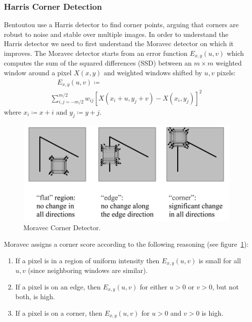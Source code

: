 \subsubsection{Harris Corner Detection}
Bentoutou \etal\cite{bentoutou2005automatic} use a Harris detector\cite{harris1988combined} to find corner points, arguing that corners are robust to noise and stable over multiple images.
%
In order to understand the Harris detector we need to first understand the Moravec\cite{moravec1980obstacle} detector on which it improves.
%
The Moravec detector starts from an error function \(E_{x,y}(u,v)\) which computes the sum of the squared differences (SSD) between an \(m \times m\) weighted window around a pixel \(X(x, y)\) and weighted windows shifted by \(u,v\) pixels:
\begin{multline}
	\quad E_{x,y}(u,v) \coloneqq \\ \sum_{i,j=-m/2}^{m/2} w_{ij}\left[ X(x_i+ u,y_j+v) - X(x_i, y_j)\right]^2
	\label{moravecerrorfunction}
\end{multline}
where \(x_i \coloneqq x + i\) and \(y_j \coloneqq y+j\).
\begin{figure}
	\centering
	\includegraphics[width=\linewidth,keepaspectratio]{figures/registration/corners.png}
	\caption{Moravec Corner Detector.}
	\label{fig:corners}
\end{figure}
Moravec assigns a corner score according to the following reasoning (see figure~\ref{fig:corners}):
\begin{framed}
	\begin{enumerate}
		\item If a pixel is in a region of uniform intensity then \(E_{x,y}(u,v)\) is small for all \(u,v\) (since neighboring windows are similar).
		\item If a pixel is on an edge, then \(E_{x,y}(u,v)\) for either \(u > 0\) or \(v > 0\), but not both, is high.
		\item If a pixel is on a corner, then \(E_{x,y}(u,v)\) for \(u > 0\) and \(v > 0\) is high.
	\end{enumerate}
\end{framed}
